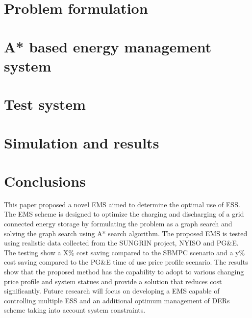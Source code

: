 \documentclass[journal]{IEEEtran}
\begin{document}
\section{Problem formulation}


\section{A* based energy management system} \label{A*}




\section{Test system} \label{sys}


\section{Simulation and results}



\section{Conclusions}
This paper proposed a novel EMS aimed to determine the optimal use of ESS. The EMS scheme is designed to optimize the charging and discharging of a grid connected energy storage by formulating the problem as a graph search and solving the graph search using A* search algorithm. The proposed EMS is tested using realistic data collected from the SUNGRIN project, NYISO and PG&E. The testing show a X\% cost saving compared to the SBMPC scenario and a y\% cost saving compared to the PG&E time of use price profile scenario. The results show that the proposed method has the capability to adopt to various changing price profile and system statues and provide a solution that reduces cost significantly. Future research will focus on developing a EMS capable of controlling multiple ESS and an additional optimum management of DERs scheme taking into account system constraints.


















\ifCLASSOPTIONcaptionsoff
  \newpage
\fi
\end{document}
